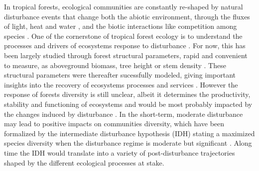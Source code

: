 \documentclass[fleqn,10pt]{ArtEcoFoG} %
\theoremstyle{definition}
\theoremstyle{definition}
\theoremstyle{definition}
\theoremstyle{remark}
\begin{document}
In tropical forests, ecological communities are constantly re-shaped by
natural disturbance events that change both the abiotic environment,
through the fluxes of light, heat and water \citep{Goulamoussene2017},
and the biotic interactions like competition among species
\citep{Chesson2000, Herault2018}. One of the cornerstone of tropical
forest ecology is to understand the processes and drivers of ecosystems
response to disturbance \citep{White2001, Chazdon2003a}. For now, this
has been largely studied through forest structural parameters, rapid and
convenient to measure, as aboveground biomass, tree height or stem
density \citep{Piponiot2016, Rutishauser2016}. These structural
parameters were thereafter sucessfully modeled, giving important
insights into the recovery of ecosystems processes and services
\citep{Herault2018}. However the response of forests diversity is still
unclear, albeit it determines the productivity, stability and
functioning of ecosystems \citep[\citet{Liang2016}]{Tilman2014} and
would be most probably impacted by the changes induced by disturbance
\citep{Baraloto2012a}. In the short-term, moderate disturbance may lead
to positive impacts on communities diversity, which have been formalized
by the intermediate disturbance hypothesis (IDH) stating a maximized
species diversity when the disturbance regime is moderate but
significant \citep{Molino2001, Kariuki2006a, Berry2008a}. Along time the
IDH would translate into a variety of post-disturbance trajectories
shaped by the different ecological processes at stake.
\end{document}
